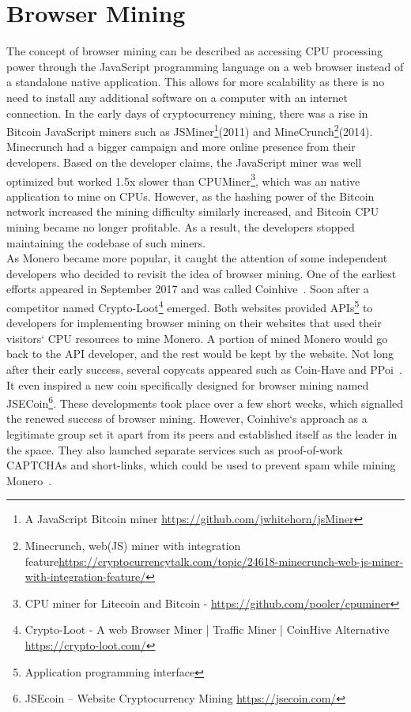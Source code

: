 \section{Browser Mining}
The concept of browser mining can be described as accessing CPU processing power through the JavaScript programming language on a web browser instead of a standalone native application. This allows for more scalability as there is no need to install any additional software on a computer with an internet connection. In the early days of cryptocurrency mining, there was a rise in Bitcoin JavaScript miners such as JSMiner\footnote{A JavaScript Bitcoin miner \url{https://github.com/jwhitehorn/jsMiner}}(2011) and MineCrunch\footnote{Minecrunch, web(JS) miner with integration feature\url{https://cryptocurrencytalk.com/topic/24618-minecrunch-web-js-miner-with-integration-feature/}}(2014). Minecrunch had a bigger campaign and more online presence from their developers. Based on the developer claims, the JavaScript miner was well optimized but worked 1.5x slower than CPUMiner\footnote{CPU miner for Litecoin and Bitcoin - \url{https://github.com/pooler/cpuminer}}, which was an native application to mine on CPUs. However, as the hashing power of the Bitcoin network increased the mining difficulty similarly increased, and Bitcoin CPU mining became no longer profitable. As a result, the developers stopped maintaining the codebase of such miners.
\\
As Monero became more popular, it caught the attention of some independent developers who decided to revisit the idea of browser mining. One of the earliest efforts appeared in September 2017 and was called Coinhive~\cite{coinhive}. Soon after a competitor named Crypto-Loot\footnote{Crypto-Loot - A web Browser Miner | Traffic Miner | CoinHive Alternative \url{https://crypto-loot.com/}} emerged. Both websites provided APIs\footnote{Application programming interface} to developers for implementing browser mining on their websites that used their visitors` CPU resources to mine Monero. A portion of mined Monero would go back to the API developer, and the rest would be kept by the website. Not long after their early success, several copycats appeared such as Coin-Have and PPoi~\cite{coinhivecopycats}. It even inspired a new coin specifically designed for browser mining named JSECoin\footnote{JSEcoin – Website Cryptocurrency Mining \url{https://jsecoin.com/}}. These developments took place over a few short weeks, which signalled the renewed success of browser mining. However, Coinhive`s approach as a legitimate group set it apart from its peers and established itself as the leader in the space. They also launched separate services such as proof-of-work CAPTCHAs and short-links, which could be used to prevent spam while mining Monero~\cite{coinhive}.

